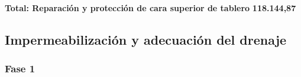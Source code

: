 \documentclass{book}%
\begin{document}
%
\noindent%
\large%
\textbf{Total: Reparación y protección de cara superior de tablero }%
\dotfill%
\textbf{118.144,87}%
\newline%
\normalsize

%
\subsection{Impermeabilización y adecuación del drenaje}%
\subsubsection{Fase 1}%
\small%
%
%
%
\tablelasttail{\hline%
}%
\end{document}
